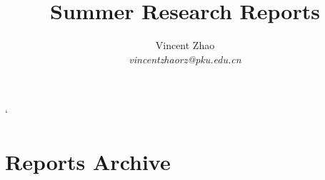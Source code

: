 \documentclass{article}
\begin{document}
\title{Summer Research Reports}
\author{Vincent Zhao\\
		\textit{vincentzhaorz@pku.edu.cn}}
\maketitle

\tableofcontents

\newpage`

\section{Reports Archive}

\end{document}

